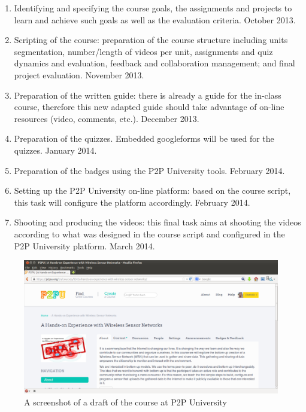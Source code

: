 \documentclass[a4paper,oneside]{book}   %
\begin{document}
\begin{enumerate}
    \item Identifying and specifying the course goals, the assignments and projects to learn and achieve such goals as well as the evaluation criteria. October 2013.
	\item Scripting of the course: preparation of the course structure including units segmentation, number/length of videos per unit, assignments and quiz dynamics and evaluation, feedback and collaboration management; and final project evaluation. November 2013.
	\item Preparation of the written guide: there is already a guide for the in-class course, therefore this new adapted guide should take advantage of on-line resources (video, comments, etc.). December 2013.
    \item Preparation of the quizzes. 
    Embedded googleforms will be used for the quizzes. January 2014.
    \item Preparation of the badges using the P2P University tools. February 2014.
	\item Setting up the P2P University on-line platform: based on the course script, this task will configure the platform accordingly. February 2014.
	\item Shooting and producing the videos: this final task aims at shooting the videos according to what was designed in the course script and configured in the P2P University platform. March 2014.
\end{enumerate}


\begin{figure}
\begin{center}
\includegraphics[width=1.00\linewidth]{screenshot}
\caption{A screenshot of a draft of the course at P2P University}
\label{fig:SCK}
\end{center}
\end{figure}
\end{document}
